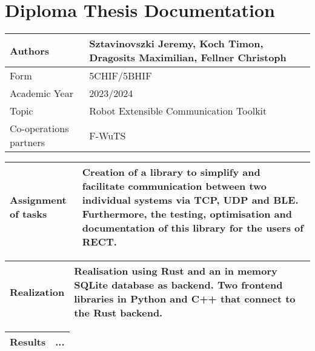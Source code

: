 \chapter{Diploma Thesis Documentation}
\begin{center}
    \begin{tabular}{| m{8cm} | m{8cm} |}
        \hline
        Authors & Sztavinovszki Jeremy, Koch Timon, Dragosits Maximilian, Fellner Christoph\\
        \hline
        Form & 5CHIF/5BHIF\\
        Academic Year & 2023/2024\\
        \hline
        Topic & Robot Extensible Communication Toolkit\\
        \hline
        Co-operations partners & F-WuTS\\
        \hline
    \end{tabular}
    
    \vspace{5mm}
    
    \begin{tabular}{| m{8cm} | m{8cm} |}
        \hline
        Assignment of tasks & Creation of a library to simplify and facilitate communication between two individual systems via TCP, UDP and BLE. Furthermore, the testing, optimisation and documentation of this library for the users of RECT.\\ %
        \hline
    \end{tabular}
    
    \vspace{5mm}
    
    \begin{tabular}{| m{8cm} | m{8cm} |}
        \hline
        Realization & Realisation using Rust and an in memory SQLite database as backend. Two frontend libraries in Python and C++ that connect to the Rust backend.\\ %
        \hline
    \end{tabular}
    
    \vspace{5mm}
    
    \begin{tabular}{| m{8cm} | m{8cm} |}
        \hline
        Results & ...\\ %
        \hline
    \end{tabular}
    

\end{center}
